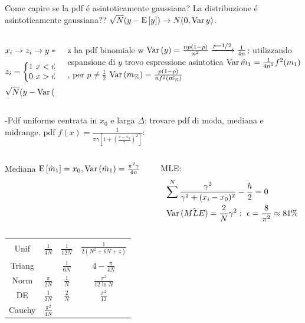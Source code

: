 \documentclass[asd-beamer.tex]{subfiles}%
\begin{document}
\begin{frame}{Come capire se la pdf \'e asintoticamente gaussiana?}
	La distribuzione \'e asintoticamente gaussiana?? $\sqrt{N}(y-\operatorname{E}{[y]})\to N(0,\operatorname{Var}{y})$.
	\begin{columns}[T]
		\begin{column}{0.5\textwidth}
			\begin{align*}
				&x_i\to z_i\to y=\frac{1}{N}\sum z_i\\
				&z_i=\left\{\begin{matrix}1\ x<\hat{m}_1\\0\ x>\hat{m}_1\\\end{matrix}\right.\\
				&\sqrt{N}(y-\operatorname{Var}{(y)})\xrightarrow{\operatorname{\mathcal{P}}{}}N(0,\operatorname{Var}{(y)})
			\end{align*}
		\end{column}
		\begin{column}{0.5\textwidth}
			z ha pdf binomiale w $\operatorname{Var}{(y)}=\frac{np(1-p)}{n^2}\xrightarrow{p=1/2}\frac{1}{4n}$: utilizzando espansione di $y$ trovo espressione asintotica $\operatorname{Var}{\hat{m}_1}=\frac{1}{4n^2}f^2(m_1)$, per $p\neq\frac{1}{2}$ $\operatorname{Var}{(m_{\%})}=\frac{p(1-p)}{nf^2(\hat{m_{\%}})}$
		\end{column}
	\end{columns}
	-Pdf uniforme centrata in $x_0$ e larga $\Delta$: trovare pdf di moda, mediana e midrange.
	pdf $f(x)=\frac{1}{\pi\gamma[1+(\frac{x-x_0}{\gamma})^2]}$:
	\begin{columns}[T]
		\begin{column}{0.5\textwidth}
			Mediana
			$\operatorname{E}{[\hat{m}_1]}=x_0, \operatorname{Var}{(\hat{m}_1)}=\frac{\pi^2\gamma}{4n}$
		\end{column}
		\begin{column}{0.5\textwidth}
			MLE:
			\begin{align*}
				&\sum^N\frac{\gamma^2}{\gamma^2+(x_i-x_0)^2}-\frac{h}{2}=0\\
				&\operatorname{Var}{(\hat{MLE})}=\frac{2}{N}\gamma^2:\ \epsilon=\frac{8}{\pi^2}\approx81\%
			\end{align*}
		\end{column}
	\end{columns}
	\begin{tabular}{c|ccc}
		Unif & $\frac{1}{4N}$ & $\frac{1}{12N}$ & $\frac{1}{2(N^2+6N+4)}$\\
		Triang & & $\frac{1}{6N}$ & $4-\frac{\pi}{4N}$\\
		Norm & $\frac{\pi}{2N}$ & $\frac{1}{N}$ & $\frac{\pi^2}{12\ln{N}}$\\
		DE & $\frac{1}{2N}$ & $\frac{2}{N}$ & $\frac{\pi^2}{12}$\\
		Cauchy & $\frac{\pi^2}{4N}$ & & \\
	\end{tabular}
\end{frame}
\end{document}
